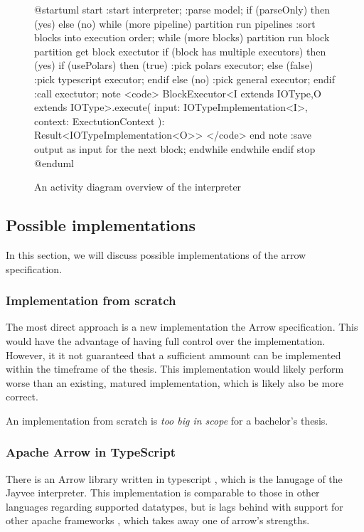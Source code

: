 \begin{figure}
	\begin{plantuml}
		@startuml
		start
		:start interpreter;
		:parse model;
		if (parseOnly) then (yes)
		else (no)
		while (more pipeline)
		partition run pipelines {
				:sort blocks into execution order;
				while (more blocks)
				partition run block {
						partition get block exectutor {
								if (block has multiple executors) then (yes)
								if (usePolars) then (true)
								:pick polars executor;
								else (false)
								:pick typescript executor;
								endif
								else (no)
								:pick general executor;
								endif
							}
						:call exectutor;
						note
						<code>
						BlockExecutor<I extends IOType,O extends IOType>.execute(
						input: IOTypeImplementation<I>,
						context: ExectutionContext
						): Result<IOTypeImplementation<O>>
						</code>
						end note
						:save output as input for the next block;
					}
				endwhile
			}
		endwhile
		endif
		stop
		@enduml
	\end{plantuml}
	\caption{An activity diagram overview of the interpreter}
	\label{fig:interpreter_activity}
\end{figure}


\subsection{Possible implementations}
\label{subsection:arrow implementations}

In this section, we will discuss possible implementations of the arrow specification.

\subsubsection{Implementation from scratch}
\label{subsubsection:direct_implementation}
The most direct approach is a new implementation the Arrow specification.
This would have the advantage of having full control over the implementation.
However, it it not guaranteed that a sufficient ammount can be implemented within the timeframe of the thesis.
This implementation would likely perform worse than an existing, matured implementation, which is likely also be more correct.

An implementation from scratch is \emph{too big in scope} for a bachelor's thesis.

\subsubsection{Apache Arrow in TypeScript}
\label{subsubsection:arrow_in_js}
There is an Arrow library written in typescript \autocite{arrow:overview}, which is the lanugage of the Jayvee interpreter.
This implementation is comparable to those in other languages regarding supported datatypes, but is lags behind with support for other apache frameworks \autocite{arrow:status}, which takes away one of arrow's strengths.

